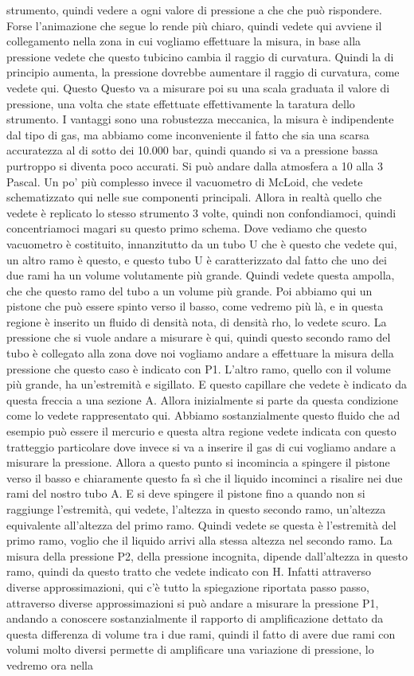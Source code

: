 strumento, quindi vedere a ogni valore di pressione a che che può rispondere. Forse l'animazione che segue lo rende più chiaro, quindi vedete qui avviene il collegamento nella zona in cui vogliamo effettuare la misura, in base alla pressione vedete che questo tubicino cambia il raggio di curvatura. Quindi la di principio aumenta, la pressione dovrebbe aumentare il raggio di curvatura, come vedete qui. Questo Questo va a misurare poi su una scala graduata il valore di pressione, una volta che state effettuate effettivamente la taratura dello strumento. I vantaggi sono una robustezza meccanica, la misura è indipendente dal tipo di gas, ma abbiamo come inconveniente il fatto che sia una scarsa accuratezza al di sotto dei 10.000 bar, quindi quando si va a pressione bassa purtroppo si diventa poco accurati. Si può andare dalla atmosfera a 10 alla 3 Pascal. Un po' più complesso invece il vacuometro di McLoid, che vedete schematizzato qui nelle sue componenti principali. Allora in realtà quello che vedete è replicato lo stesso strumento 3 volte, quindi non confondiamoci, quindi concentriamoci magari su questo primo schema. Dove vediamo che questo vacuometro è costituito, innanzitutto da un tubo U che è questo che vedete qui, un altro ramo è questo, e questo tubo U è caratterizzato dal fatto che uno dei due rami ha un volume volutamente più grande. Quindi vedete questa ampolla, che che questo ramo del tubo a un volume più grande. Poi abbiamo qui un pistone che può essere spinto verso il basso, come vedremo più là, e in questa regione è inserito un fluido di densità nota, di densità rho, lo vedete scuro. La pressione che si vuole andare a misurare è qui, quindi questo secondo ramo del tubo è collegato alla zona dove noi vogliamo andare a effettuare la misura della pressione che questo caso è indicato con P1. L'altro ramo, quello con il volume più grande, ha un'estremità e sigillato. E questo capillare che vedete è indicato da questa freccia a una sezione A. Allora inizialmente si parte da questa condizione come lo vedete rappresentato qui. Abbiamo sostanzialmente questo fluido che ad esempio può essere il mercurio e questa altra regione vedete indicata con questo tratteggio particolare dove invece si va a inserire il gas di cui vogliamo andare a misurare la pressione. Allora a questo punto si incomincia a spingere il pistone verso il basso e chiaramente questo fa sì che il liquido incominci a risalire nei due rami del nostro tubo A. E si deve spingere il pistone fino a quando non si raggiunge l'estremità, qui vedete, l'altezza in questo secondo ramo, un'altezza equivalente all'altezza del primo ramo. Quindi vedete se questa è l'estremità del primo ramo, voglio che il liquido arrivi alla stessa altezza nel secondo ramo. La misura della pressione P2, della pressione incognita, dipende dall'altezza in questo ramo, quindi da questo tratto che vedete indicato con H. Infatti attraverso diverse approssimazioni, qui c'è tutto la spiegazione riportata passo passo, attraverso diverse approssimazioni si può andare a misurare la pressione P1, andando a conoscere sostanzialmente il rapporto di amplificazione dettato da questa differenza di volume tra i due rami, quindi il fatto di avere due rami con volumi molto diversi permette di amplificare una variazione di pressione, lo vedremo ora nella 
